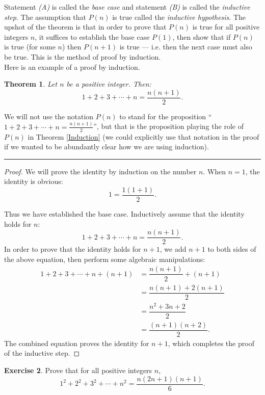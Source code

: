 \documentclass[12pt]{article}
\newtheorem{theorem}{\color{navy}Theorem}[section]
\theoremstyle{definition}
\newtheorem{exercise}[theorem]{\color{orange}Exercise}
\numberwithin{equation}{subsection}
\begin{document}
Statement \emph{(A)} is called the \emph{base case} and statement \emph{(B)} is called the \emph{inductive step}.  The assumption that $P(n)$ is true called the \emph{inductive hypothesis}.  The upshot of the theorem is that in order to prove that $P(n)$ is true for all positive integers $n$, it suffices to establish the base case $P(1)$, then show that if $P(n)$ is true (for some $n$) then $P(n + 1)$ is true --- i.e. then the next case must also be true.  This is the method of proof by induction.\\

Here is an example of a proof by induction.  
\begin{theorem}  Let $n$ be a positive integer.  Then:
$$1 + 2 + 3 + \dotsm + n = \dfrac{n (n + 1)}{2}.$$
\end{theorem}

\noindent We will not use the notation $P(n)$ to stand for the proposition ``$1 + 2 + 3 + \dotsm + n = \tfrac{n (n + 1)}{2}$'', but that is the proposition playing the role of $P(n)$ in Theorem \ref{Induction} (we could explicitly use that notation in the proof if we wanted to be abundantly clear how we are using induction).\\

\hrule

\begin{proof}
We will prove the identity by induction on the number $n$.  When $n = 1$, the identity is obvious:
$$1 = \dfrac{1 (1 + 1)}{2}.$$

\noindent Thus we have established the base case.  Inductively assume that the identity holds for $n$:
\[
1 + 2 + 3 + \dotsm + n = \dfrac{n (n + 1)}{2}.
\]
In order to prove that the identity holds for $n + 1$, we add $n + 1$ to both sides of the above equation, then perform some algebraic manipulations:
\begin{align*}
1 + 2 + 3 + \dotsm + n + (n + 1) &= \dfrac{n (n + 1)}{2} + (n + 1) \\
&= \dfrac{n ( n + 1) + 2(n + 1)}{2} \\
&= \dfrac{n^2 + 3n + 2}{2} \\
&= \dfrac{(n + 1)(n + 2)}{2}.
\end{align*}
The combined equation proves the identity for $n + 1$, which completes the proof of the inductive step.
\end{proof}


\begin{exercise}  Prove that for all positive integers $n$,  
\[
1^2 + 2^2 + 3^2 + \dotsm + n^2 = \dfrac{n(2n + 1)(n + 1)}{6}.
\]

\end{exercise}
\end{document}
